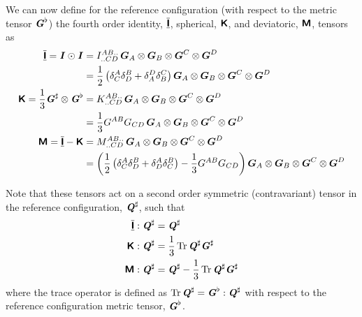 We can now define for the reference configuration (\ie with respect to the
metric tensor $\boldsymbol{\mathit{G}}^{\flat}$) the fourth order identity,
$  \overline{\underline{\boldsymbol{\mathsf{ I }}}}  $, spherical, $  \boldsymbol{\mathsf{ K }}  $, and deviatoric,
$  \boldsymbol{\mathsf{ M }}  $, tensors as
\begin{align}
    \overline{\underline{\boldsymbol{\mathsf{ I }}}}  =    \boldsymbol{\mathit{ I }}   \odot   \boldsymbol{\mathit{ I }}   &=
   I ^{AB..}_{..CD}\, \boldsymbol{G}_{A} \otimes \boldsymbol{G}_{B} \otimes \boldsymbol{G}^{C} \otimes \boldsymbol{G}^{D} 
  \\ \nonumber
  &=\dfrac{1}{2}\left(  \delta^{A}_{C}  \delta^{B}_{D} + \delta^{D}_{A}  \delta^{C}_{B}  \right) \boldsymbol{G}_{A} \otimes \boldsymbol{G}_{B} \otimes \boldsymbol{G}^{C} \otimes \boldsymbol{G}^{D} 
  \\
    \boldsymbol{\mathsf{ K }}  =\dfrac{1}{3}  \boldsymbol{\mathit{G}}^{\sharp}  \otimes \boldsymbol{\mathit{G}}^{\flat} &=
   K ^{AB..}_{..CD}\, \boldsymbol{G}_{A} \otimes \boldsymbol{G}_{B} \otimes \boldsymbol{G}^{C} \otimes \boldsymbol{G}^{D} 
  \\ \nonumber
  &=\dfrac{1}{3}G^{AB}G_{CD}\, \boldsymbol{G}_{A} \otimes \boldsymbol{G}_{B} \otimes \boldsymbol{G}^{C} \otimes \boldsymbol{G}^{D} \\
    \boldsymbol{\mathsf{ M }}  =  \overline{\underline{\boldsymbol{\mathsf{ I }}}}  -  \boldsymbol{\mathsf{ K }}  &=
   M ^{AB..}_{..CD}\, \boldsymbol{G}_{A} \otimes \boldsymbol{G}_{B} \otimes \boldsymbol{G}^{C} \otimes \boldsymbol{G}^{D} 
  \\ \nonumber
 &= \left( \dfrac{1}{2}\left(  \delta^{A}_{C}  \delta^{B}_{D} + \delta^{A}_{D}  \delta^{B}_{C}  \right)-\dfrac{1}{3}G^{AB}G_{CD} \right) \boldsymbol{G}_{A} \otimes \boldsymbol{G}_{B} \otimes \boldsymbol{G}^{C} \otimes \boldsymbol{G}^{D} 
\end{align}

Note that these tensors act on a second order symmetric (contravariant) tensor
in the reference configuration, $ \boldsymbol{\mathit{Q}}^{\sharp} $, such that
\begin{align}
     \overline{\underline{\boldsymbol{\mathsf{ I }}}}   :  \boldsymbol{\mathit{Q}}^{\sharp}  &= \boldsymbol{\mathit{Q}}^{\sharp}  \\
     \boldsymbol{\mathsf{ K }}   :  \boldsymbol{\mathit{Q}}^{\sharp}  &=\dfrac{1}{3}\operatorname{Tr} \boldsymbol{\mathit{Q}}^{\sharp}  \boldsymbol{\mathit{G}}^{\sharp}  \\
     \boldsymbol{\mathsf{ M }}   :  \boldsymbol{\mathit{Q}}^{\sharp}  &= \boldsymbol{\mathit{Q}}^{\sharp} -\dfrac{1}{3}\operatorname{Tr} \boldsymbol{\mathit{Q}}^{\sharp}  \boldsymbol{\mathit{G}}^{\sharp} 
\end{align}
where the trace operator is defined as
$\operatorname{Tr} \boldsymbol{\mathit{Q}}^{\sharp} = \boldsymbol{\mathit{G}}^{\flat} :  \boldsymbol{\mathit{Q}}^{\sharp}  $
\ie with respect to the reference configuration metric tensor,
$\boldsymbol{\mathit{G}}^{\flat}$.

